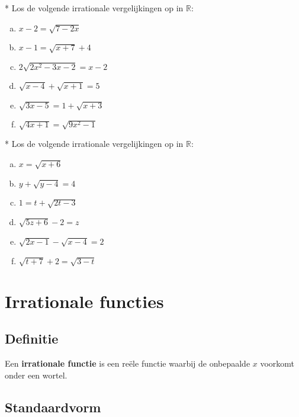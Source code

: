 \documentclass[12pt,twoside]{article}
\begin{document}
\begin{oefening}*
Los de volgende irrationale vergelijkingen op in $\mathbb{R}$:
\begin{multicols}{2}
\begin{enumerate}[(a)]
  \item $x-2=\sqrt{7-2x}$
  \item $x-1=\sqrt{x+7}+4$
  \item $2\sqrt{2x^2-3x-2}=x-2$
  \item $\sqrt{x-4}+\sqrt{x+1}=5$
  \item $\sqrt{3x-5}=1+\sqrt{x+3}$
  \item $\sqrt{4x+1}=\sqrt{9x^2-1}$
\end{enumerate}
\end{multicols}
\end{oefening}

\begin{oefening}* %
Los de volgende irrationale vergelijkingen op in $\mathbb{R}$:
\begin{multicols}{2}
\begin{enumerate}[(a)]
  \item $x=\sqrt{x+6}$
  \item $y+\sqrt{y-4}=4$
  \item $1=t+\sqrt{2t-3}$
  \item $\sqrt{5z+6}-2=z$
  \item $\sqrt{2x-1}-\sqrt{x-4}=2$
  \item $\sqrt{t+7}+2=\sqrt{3-t}$
\end{enumerate}
\end{multicols}
\end{oefening}

\pagebreak
\section{Irrationale functies}

\subsection{Definitie}

Een {\bf irrationale functie} is een reële functie waarbij de onbepaalde $x$ voorkomt onder een wortel.

\subsection{Standaardvorm}
\end{document}

